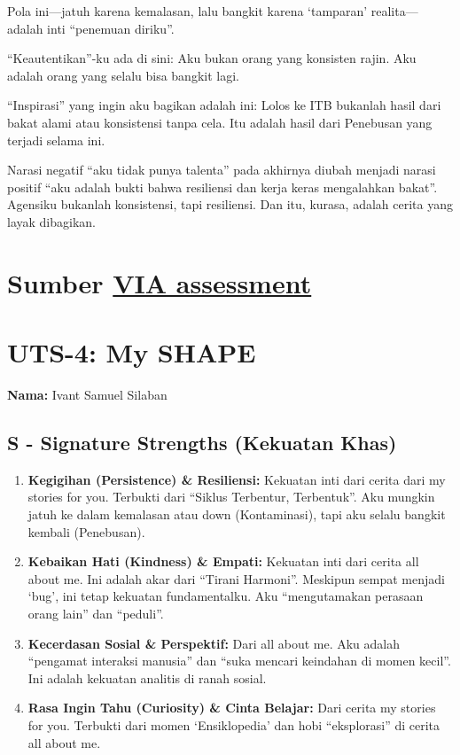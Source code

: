 \documentclass[
  letterpaper,
  DIV=11,
  numbers=noendperiod]{scrreprt}
\begin{document}
Pola ini---jatuh karena kemalasan, lalu bangkit karena `tamparan'
realita---adalah inti ``penemuan diriku''.

``Keautentikan''-ku ada di sini: Aku bukan orang yang konsisten rajin.
Aku adalah orang yang selalu bisa bangkit lagi.

``Inspirasi'' yang ingin aku bagikan adalah ini: Lolos ke ITB bukanlah
hasil dari bakat alami atau konsistensi tanpa cela. Itu adalah hasil
dari Penebusan yang terjadi selama ini.

Narasi negatif ``aku tidak punya talenta'' pada akhirnya diubah menjadi
narasi positif ``aku adalah bukti bahwa resiliensi dan kerja keras
mengalahkan bakat''. Agensiku bukanlah konsistensi, tapi resiliensi. Dan
itu, kurasa, adalah cerita yang layak dibagikan.


\chapter{\texorpdfstring{Sumber
\href{StrengthsProfile-Armein-Langi.pdf}{VIA
assessment}}{Sumber VIA assessment}}\label{sumber-via-assessment}


\chapter{UTS-4: My SHAPE}\label{uts-4-my-shape}

\textbf{Nama:} Ivant Samuel Silaban

\section{S - Signature Strengths (Kekuatan
Khas)}\label{s---signature-strengths-kekuatan-khas}

\begin{enumerate}
\def\labelenumi{\arabic{enumi}.}
\item
  \textbf{Kegigihan (Persistence) \& Resiliensi:} Kekuatan inti dari
  cerita dari my stories for you. Terbukti dari ``Siklus Terbentur,
  Terbentuk''. Aku mungkin jatuh ke dalam kemalasan atau down
  (Kontaminasi), tapi aku selalu bangkit kembali (Penebusan).
\item
  \textbf{Kebaikan Hati (Kindness) \& Empati:} Kekuatan inti dari cerita
  all about me. Ini adalah akar dari ``Tirani Harmoni''. Meskipun sempat
  menjadi `bug', ini tetap kekuatan fundamentalku. Aku ``mengutamakan
  perasaan orang lain'' dan ``peduli''.
\item
  \textbf{Kecerdasan Sosial \& Perspektif:} Dari all about me. Aku
  adalah ``pengamat interaksi manusia'' dan ``suka mencari keindahan di
  momen kecil''. Ini adalah kekuatan analitis di ranah sosial.
\item
  \textbf{Rasa Ingin Tahu (Curiosity) \& Cinta Belajar:} Dari cerita my
  stories for you. Terbukti dari momen `Ensiklopedia' dan hobi
  ``eksplorasi'' di cerita all about me.
\end{enumerate}
\end{document}
